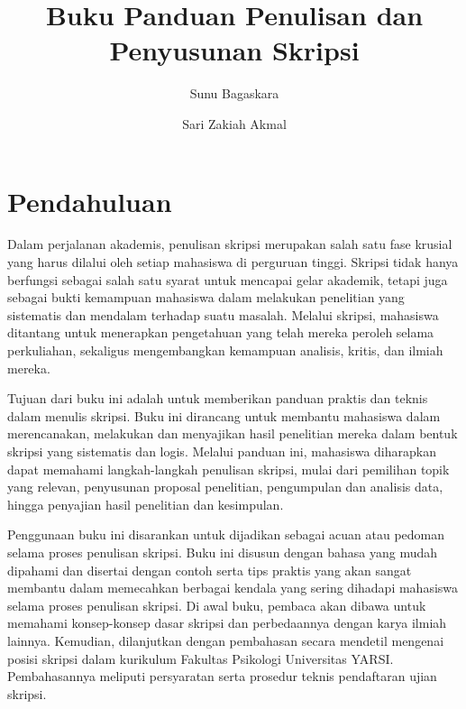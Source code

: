\documentclass[
  indonesian,
  letterpaper,
]{scrbook}
\title{Buku Panduan Penulisan dan Penyusunan Skripsi}
\author{Sunu Bagaskara \and Sari Zakiah Akmal}
\date{}
\renewcommand*\contentsname{Daftar Isi}
\newcommand\contentsname{Daftar Isi}
\begin{document}
\frontmatter
\maketitle

\renewcommand*\contentsname{Daftar Isi}
{
\setcounter{tocdepth}{2}
\tableofcontents
}

\mainmatter
{}

\chapter*{\texorpdfstring{\textbf{Pendahuluan}}{Pendahuluan}}\label{pendahuluan}


Dalam perjalanan akademis, penulisan skripsi merupakan salah satu fase
krusial yang harus dilalui oleh setiap mahasiswa di perguruan tinggi.
Skripsi tidak hanya berfungsi sebagai salah satu syarat untuk mencapai
gelar akademik, tetapi juga sebagai bukti kemampuan mahasiswa dalam
melakukan penelitian yang sistematis dan mendalam terhadap suatu
masalah. Melalui skripsi, mahasiswa ditantang untuk menerapkan
pengetahuan yang telah mereka peroleh selama perkuliahan, sekaligus
mengembangkan kemampuan analisis, kritis, dan ilmiah mereka.

Tujuan dari buku ini adalah untuk memberikan panduan praktis dan teknis
dalam menulis skripsi. Buku ini dirancang untuk membantu mahasiswa dalam
merencanakan, melakukan dan menyajikan hasil penelitian mereka dalam
bentuk skripsi yang sistematis dan logis. Melalui panduan ini, mahasiswa
diharapkan dapat memahami langkah-langkah penulisan skripsi, mulai dari
pemilihan topik yang relevan, penyusunan proposal penelitian,
pengumpulan dan analisis data, hingga penyajian hasil penelitian dan
kesimpulan.

Penggunaan buku ini disarankan untuk dijadikan sebagai acuan atau
pedoman selama proses penulisan skripsi. Buku ini disusun dengan bahasa
yang mudah dipahami dan disertai dengan contoh serta tips praktis yang
akan sangat membantu dalam memecahkan berbagai kendala yang sering
dihadapi mahasiswa selama proses penulisan skripsi. Di awal buku,
pembaca akan dibawa untuk memahami konsep-konsep dasar skripsi dan
perbedaannya dengan karya ilmiah lainnya. Kemudian, dilanjutkan dengan
pembahasan secara mendetil mengenai posisi skripsi dalam kurikulum
Fakultas Psikologi Universitas YARSI. Pembahasannya meliputi persyaratan
serta prosedur teknis pendaftaran ujian skripsi.
\end{document}
